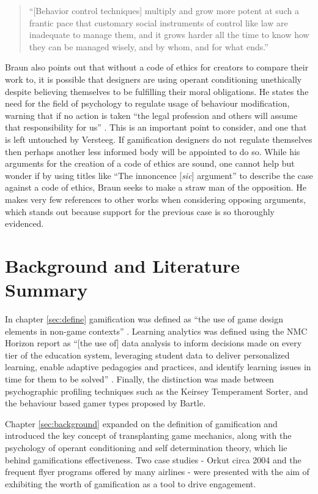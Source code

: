 \documentclass[12pt,a4paper,twoside]{report}
\begin{document}
\begin{quote}
	``[Behavior control techniques]
	multiply and grow more potent at such a frantic pace that customary
	social instruments of control like law are inadequate to
	manage them, and it grows harder all the time to know how
	they can be managed wisely, and by whom, and for what ends.''\cite{london1969behavioral}
\end{quote}

Braun also points out that without a code of ethics for creators to compare their work to, it is possible that designers are using operant conditioning unethically despite believing themselves to be fulfilling their moral obligations. He states the need for the field of psychology to regulate usage of behaviour modification, warning that if no action is taken ``the legal profession and others will assume that responsibility for us'' \cite{braun1975ethical}. This is an important point to consider, and one that is left untouched by Versteeg. If gamification designers do not regulate themselves then perhaps another less informed body will be appointed to do so. While his arguments for the creation of a code of ethics are sound, one cannot help but wonder if by using titles like ``The innoncence [\textit{sic}] argument'' to describe the case against a code of ethics, Braun seeks to make a straw man of the opposition. He makes very few references to other works when considering opposing arguments, which stands out because support for the previous case is so thoroughly evidenced.

\chapter{Background and Literature Summary}
In chapter \ref{sec:define} gamification was defined as ``the use of game design elements in non-game contexts'' \cite{deterding2011game}. Learning analytics was defined using the NMC Horizon report\cite{johnson2014nmc} as ``[the use of] data analysis to inform decisions made on every tier of the education system, leveraging student data to deliver personalized learning, enable adaptive pedagogies and practices, and identify learning issues in time for them to be solved'' \cite{johnson2014nmc}. Finally, the distinction was made between psychographic profiling techniques such as the Keirsey Temperament Sorter, and the behaviour based gamer types proposed by Bartle.

Chapter \ref{sec:background} expanded on the definition of gamification and introduced the key concept of transplanting game mechanics, along with the psychology of operant conditioning and self determination theory, which lie behind gamifications effectiveness. Two case studies - Orkut circa 2004 and the frequent flyer programs offered by many airlines - were presented with the aim of exhibiting the worth of gamification as a tool to drive engagement.
\end{document}
